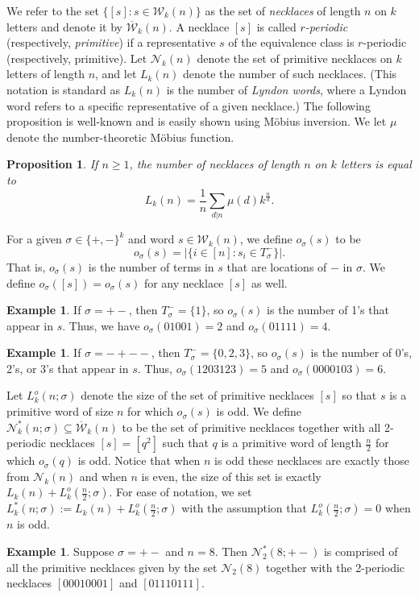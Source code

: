 \documentclass[12pt]{article}
\newcommand{\todo}[1]{\vspace{2 mm}\par\noindent
   \marginpar[\flushright\textsc{ToDo}]{\textsc{ToDo}}\framebox{\begin{minipage}[c]{\textwidth}
   \tt #1 \end{minipage}}\vspace{2 mm}\par}
\newcommand{\N}{\mathcal{N}}
\newcommand{\W}{\mathcal{W}}
\theoremstyle{plain}
\newtheorem{prop}[theorem]{Proposition}
\theoremstyle{definition}
\newtheorem{example}[theorem]{Example}
\begin{document}
We refer to the set $\{[s]: s\in \W_k(n)\}$ as the set of \textit{necklaces} of length $n$ on $k$ letters and denote it by $\overline{\W}_k(n)$. A necklace $[s]$ is called \textit{$r$-periodic} (respectively, \textit{primitive}) if a representative $s$ of the equivalence class is $r$-periodic (respectively, primitive). Let $\N_k(n)$ denote the set of primitive necklaces on $k$ letters of length $n$, and let $L_k(n)$ denote the number of such necklaces. (This notation is standard as $L_k(n)$ is the number of \textit{Lyndon words}, where a Lyndon word refers to a specific representative of a given necklace.)
The following proposition is well-known and is easily shown using M\"obius inversion. We let $\mu$ denote the number-theoretic M\"obius function.
\begin{prop}
If $n\geq 1$, the number of necklaces of length $n$ on $k$ letters is equal to
\[ L_k(n) = \frac{1}{n}\sum_{d|n} \mu(d)k^{\frac{n}{d}}.\]
\end{prop}

For a given $\sigma \in \{+,-\}^k$ and word $s \in \W_k(n)$, we define $o_\sigma(s)$ to be $$o_\sigma(s)=|\{i \in [n] : s_i \in T^-_\sigma\}|.$$ That is, $o_\sigma(s)$ is the number of terms in $s$ that are locations of $-$ in $\sigma$. We define $o_\sigma([s])=o_{\sigma}(s)$ for any necklace $[s]$ as well. 
\begin{example}
If $\sigma = +-$, then $T^-_\sigma=\{1\}$, so $o_\sigma(s)$ is the number of 1's that appear in $s$. Thus, we have $o_\sigma(01001) = 2$ and $o_\sigma(01111) = 4$. 
\end{example}
\begin{example}
If $\sigma = -+--$, then $T_\sigma^-=\{0,2,3\}$, so $o_\sigma(s)$ is the number of 0's, 2's, or 3's that appear in $s$. Thus, $o_\sigma(1203123) = 5$ and $o_\sigma(0000103) = 6$. 
\end{example}
Let  $L^o_k(n;\sigma)$ denote the size of the set of primitive necklaces $[s]$ so that $s$ is a primitive word of size $n$ for which $o_\sigma(s)$ is odd.
We define $\N^*_k(n;\sigma)\subseteq \overline{\W}_k(n)$ to be the set of primitive necklaces together with all 2-periodic necklaces $[s] = [q^2]$ such that $q$ is a primitive word of length $\frac{n}{2}$ for which $o_\sigma(q)$ is odd. Notice that when $n$ is odd these necklaces are exactly those from $\N_k(n)$ and when $n$ is even, the size of this set is exactly $L_k(n)+L^o_k(\frac n2;\sigma)$. For ease of notation, we set $L_k^*(n;\sigma) := L_k(n)+L^o_k(\frac n2;\sigma)$ with the assumption that $L^o_k\left(\frac n2 ;\sigma\right)=0$ when $n$ is odd. 
\begin{example}
Suppose $\sigma=+-$ and $n=8$. Then $\N_2^*(8;+-)$ is comprised of all the primitive necklaces given by the set $\N_2(8)$ together with the 2-periodic necklaces $[00010001]$ and $[01110111]$. 
\end{example}
\end{document}
